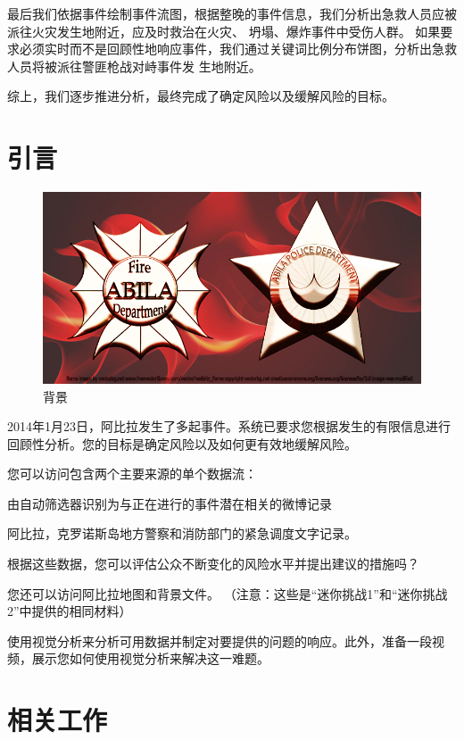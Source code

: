 \documentclass[a4paper]{article}
\begin{document}
最后我们依据事件绘制事件流图，根据整晚的事件信息，我们分析出急救人员应被派往火灾发生地附近，应及时救治在火灾、
坍塌、爆炸事件中受伤人群。
如果要求必须实时而不是回顾性地响应事件，我们通过关键词比例分布饼图，分析出急救人员将被派往警匪枪战对峙事件发
生地附近。

综上，我们逐步推进分析，最终完成了确定风险以及缓解风险的目标。
\newpage



\section{引言}
\label{overview}
\begin{figure}[htbp]
  \centering
  \includegraphics[width=1\textwidth]{images/MC3.jpg}
  \caption{背景}\label{fig:MC3}
  \vspace{\baselineskip}
\end{figure}
2014年1月23日，阿比拉发生了多起事件。系统已要求您根据发生的有限信息进行回顾性分析。您的目标是确定风险以及如何更有效地缓解风险。

您可以访问包含两个主要来源的单个数据流：

由自动筛选器识别为与正在进行的事件潜在相关的微博记录

阿比拉，克罗诺斯岛地方警察和消防部门的紧急调度文字记录。

根据这些数据，您可以评估公众不断变化的风险水平并提出建议的措施吗？

您还可以访问阿比拉地图和背景文件。 （注意：这些是“迷你挑战1”和“迷你挑战2”中提供的相同材料）

使用视觉分析来分析可用数据并制定对要提供的问题的响应。此外，准备一段视频，展示您如何使用视觉分析来解决这一难题。

\section{相关工作}
\end{document}

